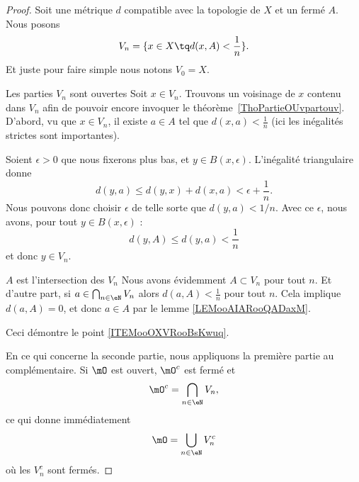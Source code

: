 \begin{proof}
    Soit une métrique \( d\) compatible avec la topologie de \( X\) et un fermé \( A\). Nous posons
    \begin{equation}
        V_n=\{ x\in X\tq d(x,A)<\frac{1}{ n } \}.
    \end{equation}
    Et juste pour faire simple nous notons \( V_0=X\).
    \begin{subproof}
        \item[Les parties \( V_n\) sont ouvertes]
            Soit \( x\in V_n\). Trouvons un voisinage de \( x\) contenu dans \( V_n\) afin de pouvoir encore invoquer le théorème~\ref{ThoPartieOUvpartouv}. D'abord, vu que \( x\in V_n\), il existe \( a\in A\) tel que \( d(x,a)<\frac{ 1 }{ n }\) (ici les inégalités strictes sont importantes).

            Soient \( \epsilon>0\) que nous fixerons plus bas, et \( y\in B(x,\epsilon)\). L'inégalité triangulaire donne
            \begin{equation}
                d(y,a)\leq d(y,x)+d(x,a)<\epsilon+\frac{1}{ n }.
            \end{equation}
            Nous pouvons donc choisir \( \epsilon\) de telle sorte que \( d(y,a)<1/n\). Avec ce \( \epsilon\), nous avons, pour tout \( y\in B(x,\epsilon)\) :
            \begin{equation}
                d(y,A)\leq d(y,a)<\frac{1}{ n }
            \end{equation}
            et donc \( y\in V_n\).
        \item[\( A\) est l'intersection des \( V_n\)]
            Nous avons évidemment \( A\subset V_n\) pour tout \( n\). Et d'autre part, si \( a\in\bigcap_{n\in \eN} V_n\) alors \( d(a,A)<\frac{1}{ n }\) pour tout \( n\). Cela implique \( d(a,A)=0\), et donc \( a\in A\) par le lemme \ref{LEMooAIARooQADaxM}.
        \end{subproof}

        Ceci démontre le point \ref{ITEMooOXVRooBsKwuq}.

    En ce qui concerne la seconde partie, nous appliquons la première partie au complémentaire. Si \( \mO\) est ouvert, \( \mO^c\) est fermé et
    \begin{equation}
        \mO^c=\bigcap_{n\in \eN}V_n,
    \end{equation}
    ce qui donne immédiatement
    \begin{equation}
        \mO=\bigcup_{n\in \eN}V_n^c
    \end{equation}
    où les \( V_n^c\) sont fermés.
\end{proof}

